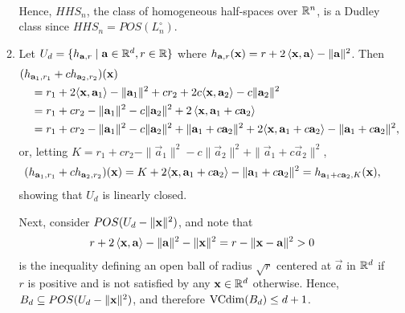\begin{ex}
\begin{enumerate}
\begin{enumerate}[1.]
\begin{align*}
                  \end{align*}
                  Hence, $HHS_n$, the class of homogeneous half-spaces
                  over $\mathbb{R}^n$, is a Dudley class since
                  $HHS_n=POS(L^\circ_n)$.
            \item Let $U_d=\{h_{\mathbf{a}, r} \mid \mathbf{a}\in\mathbb{R}^d, r\in\mathbb{R}\}$
                  where $h_{\mathbf{a},r}(\mathbf{x})=r+2\left\langle\mathbf{x},\mathbf{a}\right\rangle-\|\mathbf{a}\|^2$.
                  Then
                  \begin{align*}
                     & (h_{\mathbf{a}_1,r_1} + ch_{\mathbf{a}_2,r_2})(\mathbf{x}) \\
                     & \quad =r_1+2\langle\mathbf{x},\mathbf{a}_1\rangle
                    -\|\mathbf{a}_1\|^2
                    +cr_2+2c\langle\mathbf{x},\mathbf{a}_2\rangle
                    -c\|\mathbf{a}_2\|^2                               \\
                     & \quad =r_1+cr_2
                    -\|\mathbf{a}_1\|^2
                    -c\|\mathbf{a}_2\|^2
                    +2\left\langle \mathbf{x}, \mathbf{a}_1 + c\mathbf{a}_2 \right\rangle            \\
                     & \quad =r_1+cr_2
                    -\|\mathbf{a}_1\|^2
                    -c\|\mathbf{a}_2\|^2
                    +\|\mathbf{a}_1+c\mathbf{a}_2\|^2
                    +2\langle\mathbf{x},\mathbf{a}_1+c\mathbf{a}_2\rangle
                    -\|\mathbf{a}_1+c\mathbf{a}_2\|^2,
                  \end{align*}
                  or, letting $K=
                    r_1+cr_2
                    -\|\vec{a}_1\|^2
                    -c\|\vec{a}_2\|^2
                    +\|\vec{a}_1+c\vec{a}_2\|^2
                  $,
                  \begin{align*}
                    (h_{\mathbf{a}_1,r_1} + ch_{\mathbf{a}_2,r_2})(\mathbf{x})
                    =K+2\langle\mathbf{x},\mathbf{a}_1+c\mathbf{a}_2\rangle
                    -\|\mathbf{a}_1+c\mathbf{a}_2\|^2
                    =h_{\mathbf{a}_1+c\mathbf{a}_2, K}(\mathbf{x}),
                  \end{align*}
                  showing that $U_d$ is linearly closed.

                  Next, consider $POS(U_d-\|\mathbf{x}\|^2)$, and note that
                  \begin{align*}
                    r+2\left\langle \mathbf{x}, \mathbf{a}\right\rangle -\|\mathbf{a}\|^2-\|\mathbf{x}\|^2
                    =r-\|\mathbf{x}-\mathbf{a}\|^2>0
                  \end{align*}
                  is the inequality defining an open ball of
                  radius $\sqrt{r}$ centered at $\vec{a}$ in $\mathbb{R}^d$ if $r$ is
                  positive and is not satisfied by any $\mathbf{x}\in\mathbb{R}^d$ otherwise.
                  Hence, $B_d\subseteq POS(U_d-\|\mathbf{x}\|^2)$, and therefore
                  $\operatorname{VCdim}(B_d)\leq d+1$.


\end{enumerate}
\end{enumerate}
\end{ex}
